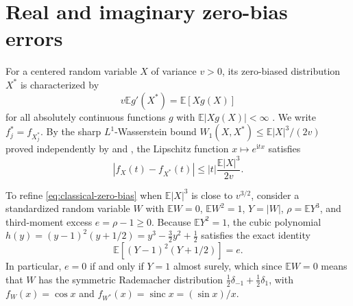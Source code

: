 \documentclass[11pt]{article}
\numberwithin{equation}{section}
\theoremstyle{remark}
\DeclareMathOperator{\sinc}{sinc}
\newcommand{\E}{\mathbb E}
\newcommand{\ii}{\mathrm i}
\begin{document}
\section{Real and imaginary zero-bias errors}\label{sec:directional}

For a centered random variable $X$ of variance $v>0$, its zero-biased
distribution $X^*$ is characterized by
\begin{equation}\label{eq:zero-bias}
 v\E g'(X^*)=\E[Xg(X)]
\end{equation}
for all absolutely continuous functions $g$ with $\E|Xg(X)|<\infty$
\citep{GoldsteinReinert1997}. We write $f_j^*=f_{X_j^*}$. By the sharp
$L^1$-Wasserstein bound $W_1(X,X^*)\le\E|X|^3/(2v)$ proved independently by
\citet[Lemma~1.1]{Goldstein2010} and \citet[Theorem~3]{Tyurin2009}, the
Lipschitz function $x\mapsto e^{\ii tx}$ satisfies
\begin{equation}\label{eq:classical-zero-bias}
 |f_X(t)-f_{X^*}(t)|\le |t|\frac{\E|X|^3}{2v}.
\end{equation}

To refine \eqref{eq:classical-zero-bias} when $\E|X|^3$ is close to
$v^{3/2}$, consider a standardized random variable $W$ with $\E W=0$,
$\E W^2=1$, $Y=|W|$, $\rho=\E Y^3$, and third-moment excess $e=\rho-1\ge0$.
Because $\E Y^2=1$, the cubic polynomial $h(y)=(y-1)^2(y+1/2)=y^3-\frac32y^2+\frac12$
satisfies the exact identity
\begin{equation}\label{eq:moment-excess}
 \E[(Y-1)^2(Y+1/2)]=e.
\end{equation}
In particular, $e=0$ if and only if $Y=1$ almost surely, which since $\E W=0$
means that $W$ has the symmetric Rademacher distribution
$\frac12\delta_{-1}+\frac12\delta_1$, with $f_W(x)=\cos x$ and
$f_{W^*}(x)=\sinc x=(\sin x)/x$.
\end{document}
